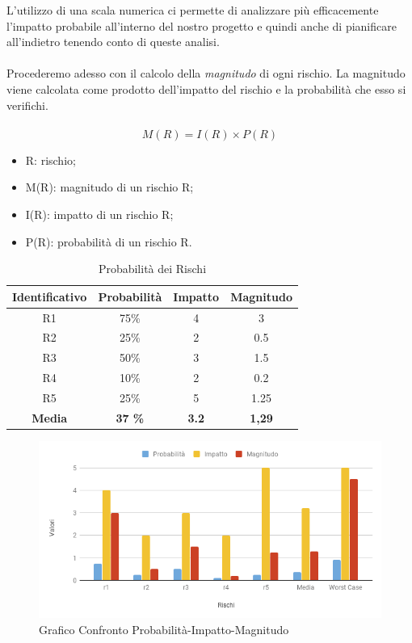 	L’utilizzo di una scala numerica ci permette di analizzare più efficacemente l’impatto probabile all’interno del nostro progetto e quindi anche di pianificare all’indietro tenendo conto di queste analisi. \\ \\ Procederemo adesso con il calcolo della \textit{magnitudo} di ogni rischio.
	La magnitudo viene calcolata come prodotto dell'impatto del rischio e la probabilità che esso si verifichi. \\ \\
	
	\begin{equation}
        M(R)= I(R) \times P(R) 
    \end{equation}
	
	\begin{itemize}
	    \item R: rischio;
	    \item M(R): magnitudo di un rischio R;
	    \item I(R): impatto di un rischio R;
	    \item P(R): probabilità di un rischio R.
	\end{itemize}
	
	\begin{table}[!htpb]
		\centering
		\renewcommand{\arraystretch}{2} 
		\begin{tabular}{|c|c|c|c|}
		    \rowcolor{orange!50}
		    \hline
		    \textbf{Identificativo} & \textbf{Probabilità} & \textbf{Impatto} & \textbf{Magnitudo}\\
			\hline
			R1 & 75\% & 4 & 3 \\
			\hline
			R2 &  25\%  & 2  & 0.5 \\
			\hline
			R3  & 50\%  & 3  & 1.5 \\
			\hline
			R4  & 10\% &  2 &  0.2 \\
			\hline
			R5  & 25\%  & 5  & 1.25 \\
			\hline
			\textbf{Media}  & \textbf{37 \%}&  \textbf{3.2} &  \textbf{1,29}\\
			\hline
		\end{tabular}
		\caption{Probabilità dei Rischi}
	\end{table}
	
	\begin{figure}
	    \centering
	    \includegraphics[scale=0.6]{elaborazione_manitudo.png} 
	    \caption{Grafico Confronto Probabilità-Impatto-Magnitudo}
	\end{figure}
	
